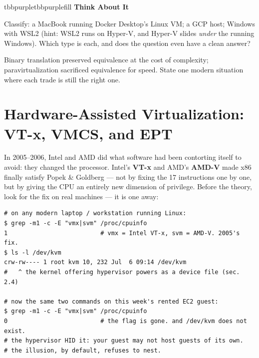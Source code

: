 \begin{calloutbox}{tbbpurple}{tbbpurplefill}
{\normalsize\bfseries\color{tbbpurple}Think About It}\par\vspace{3pt}
\begin{tbbitemize}
  \item Classify: a MacBook running Docker Desktop's Linux VM; a GCP host; Windows with WSL2 (hint: WSL2 runs on Hyper-V, and Hyper-V slides \textit{under} the running Windows). Which type is each, and does the question even have a clean answer?
  \item Binary translation preserved equivalence at the cost of complexity; paravirtualization sacrificed equivalence for speed. State one modern situation where each trade is still the right one.
\end{tbbitemize}
\end{calloutbox}

\section{Hardware-Assisted Virtualization: VT-x, VMCS, and EPT}

In 2005–2006, Intel and AMD did what software had been contorting itself to avoid: they changed the processor. Intel's \textbf{VT-x} and AMD's \textbf{AMD-V} made x86 finally satisfy Popek \& Goldberg — not by fixing the 17 instructions one by one, but by giving the CPU an entirely new dimension of privilege. Before the theory, look for the fix on real machines — it is one  away:

\begin{terminalbox}
\begin{Verbatim}[breaklines=true,breakanywhere=true,fontsize=\small,formatcom=\color{tbbtermfg},codes=\tbbcodeactive]
# on any modern laptop / workstation running Linux:
$ grep -m1 -c -E "vmx|svm" /proc/cpuinfo
1                          # vmx = Intel VT-x, svm = AMD-V. 2005's fix.
$ ls -l /dev/kvm
crw-rw---- 1 root kvm 10, 232 Jul  6 09:14 /dev/kvm
#   ^ the kernel offering hypervisor powers as a device file (sec. 2.4)

# now the same two commands on this week's rented EC2 guest:
$ grep -m1 -c -E "vmx|svm" /proc/cpuinfo
0                          # the flag is gone. and /dev/kvm does not exist.
# the hypervisor HID it: your guest may not host guests of its own.
# the illusion, by default, refuses to nest.
\end{Verbatim}
\end{terminalbox}

